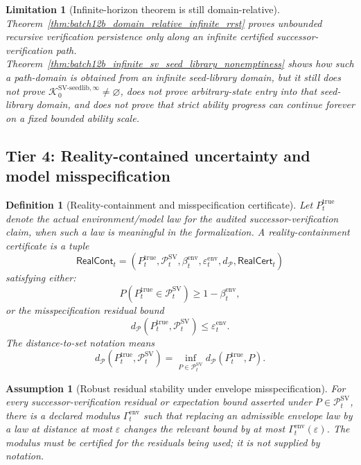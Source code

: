 \documentclass[11pt]{article}
\newtheorem{definition}[theorem]{Definition}
\newtheorem{assumption}[theorem]{Assumption}
\newtheorem{limitation}[theorem]{Limitation}
\newcommand{\Pcal}{\mathcal{P}}
\newcommand{\1}{\mathbf{1}}
\providecommand{\Kcal}{\mathcal{K}}
\providecommand{\true}{\mathrm{true}}
\begin{document}
\begin{limitation}[Infinite-horizon theorem is still domain-relative]
\label{lim:batch12b_infinite_horizon_domain_relative}
Theorem~\ref{thm:batch12b_domain_relative_infinite_rrst} proves unbounded recursive verification persistence only along an infinite certified successor-verification path.  Theorem~\ref{thm:batch12b_infinite_sv_seed_library_nonemptiness} shows how such a path-domain is obtained from an infinite seed-library domain, but it still does not prove \(\Kcal_0^{\mathrm{SV\mbox{-}seedlib},\infty}\neq\varnothing\), does not prove arbitrary-state entry into that seed-library domain, and does not prove that strict ability progress can continue forever on a fixed bounded ability scale.
\end{limitation}

\subsection{Tier 4: Reality-contained uncertainty and model misspecification}

\begin{definition}[Reality-containment and misspecification certificate]
\label{def:batch12b_reality_containment_certificate}
Let \(P_t^{\true}\) denote the actual environment/model law for the audited successor-verification claim, when such a law is meaningful in the formalization.  A reality-containment certificate is a tuple
\[
\mathsf{RealCont}_t=(P_t^{\true},\Pcal_t^{\mathrm{SV}},\beta_t^{\mathrm{env}},\varepsilon_t^{\mathrm{env}},d_{\Pcal},\mathsf{RealCert}_t)
\]
satisfying either:
\[
P(P_t^{\true}\in\Pcal_t^{\mathrm{SV}})\ge1-\beta_t^{\mathrm{env}},
\]
or the misspecification residual bound
\[
d_{\Pcal}(P_t^{\true},\Pcal_t^{\mathrm{SV}})
\le
\varepsilon_t^{\mathrm{env}}.
\]
The distance-to-set notation means
\[
d_{\Pcal}(P_t^{\true},\Pcal_t^{\mathrm{SV}})=
\inf_{P\in\Pcal_t^{\mathrm{SV}}}d_{\Pcal}(P_t^{\true},P).
\]
\end{definition}

\begin{assumption}[Robust residual stability under envelope misspecification]
\label{ass:batch12b_residual_stability_under_misspecification}
For every successor-verification residual or expectation bound asserted under \(P\in\Pcal_t^{\mathrm{SV}}\), there is a declared modulus \(\Gamma_t^{\mathrm{env}}\) such that replacing an admissible envelope law by a law at distance at most \(\varepsilon\) changes the relevant bound by at most \(\Gamma_t^{\mathrm{env}}(\varepsilon)\).  The modulus must be certified for the residuals being used; it is not supplied by notation.
\end{assumption}
\end{document}
